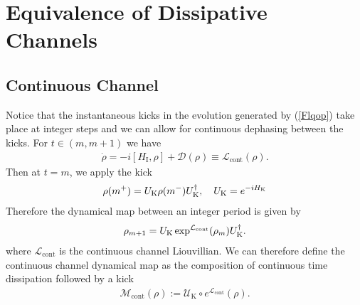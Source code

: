 \section{Equivalence of Dissipative Channels}
\label{equivalence_of_maps}
\subsection{Continuous Channel}
Notice that the instantaneous kicks in the evolution generated by (\ref{Flqop}) take place at integer steps and we can allow for continuous dephasing between the kicks. For $t \in (m,m+1)$ we have 
\begin{align}
    \dot{\rho} = -i[H_\text{I}, \rho] + \mathcal{D}(\rho) \equiv \mathcal{L}_{\text{cont}}(\rho).
\end{align}
Then at $t=m$, we apply the kick
\begin{align}
\rho(m^+)=U_{\text{K}}\rho(m^-)U_{\text{K}}^\dagger, \quad U_{\text{K}}=e^{-i H_{\text{K}}}
\end{align}
Therefore the dynamical map between an integer period is given by 
\begin{align}
    \rho_{m+1}=U_{\text{K}} \exp^{\mathcal{L}_\text{cont}}(\rho_m)U_{\text{K}}^\dagger .
\end{align}
where $\mathcal{L}_{\text{cont}}$ is the continuous channel Liouvillian. We can therefore define the continuous channel dynamical map as the composition of continuous time dissipation followed by a kick 
\begin{align}
    \mathcal{M}_{\text{cont}}(\rho):=\mathcal{U}_\text{K} \circ e^{\mathcal{L}_{\text{cont}}}(\rho).
\end{align}
